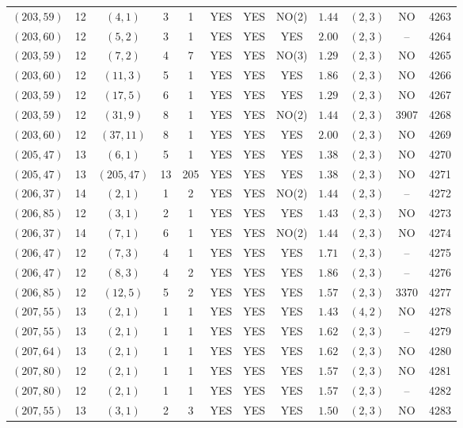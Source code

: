 \begin{longtable}{|c|c|c|c|c|c|c|c|c|c|c|c|}
$(203,59)$ & 12 & $(4,1)$ & 3 & 1 & YES & YES & NO(2) & $1.44$ & $(2,3)$ & NO & 4263\\
$(203,60)$ & 12 & $(5,2)$ & 3 & 1 & YES & YES & YES & $2.00$ & $(2,3)$ & -- & 4264\\
$(203,59)$ & 12 & $(7,2)$ & 4 & 7 & YES & YES & NO(3) & $1.29$ & $(2,3)$ & NO & 4265\\
$(203,60)$ & 12 & $(11,3)$ & 5 & 1 & YES & YES & YES & $1.86$ & $(2,3)$ & NO & 4266\\
$(203,59)$ & 12 & $(17,5)$ & 6 & 1 & YES & YES & YES & $1.29$ & $(2,3)$ & NO & 4267\\
$(203,59)$ & 12 & $(31,9)$ & 8 & 1 & YES & YES & NO(2) & $1.44$ & $(2,3)$ & 3907 & 4268\\
$(203,60)$ & 12 & $(37,11)$ & 8 & 1 & YES & YES & YES & $2.00$ & $(2,3)$ & NO & 4269\\
$(205,47)$ & 13 & $(6,1)$ & 5 & 1 & YES & YES & YES & $1.38$ & $(2,3)$ & NO & 4270\\
$(205,47)$ & 13 & $(205,47)$ & 13 & 205 & YES & YES & YES & $1.38$ & $(2,3)$ & NO & 4271\\
$(206,37)$ & 14 & $(2,1)$ & 1 & 2 & YES & YES & NO(2) & $1.44$ & $(2,3)$ & -- & 4272\\
$(206,85)$ & 12 & $(3,1)$ & 2 & 1 & YES & YES & YES & $1.43$ & $(2,3)$ & NO & 4273\\
$(206,37)$ & 14 & $(7,1)$ & 6 & 1 & YES & YES & NO(2) & $1.44$ & $(2,3)$ & NO & 4274\\
$(206,47)$ & 12 & $(7,3)$ & 4 & 1 & YES & YES & YES & $1.71$ & $(2,3)$ & -- & 4275\\
$(206,47)$ & 12 & $(8,3)$ & 4 & 2 & YES & YES & YES & $1.86$ & $(2,3)$ & -- & 4276\\
$(206,85)$ & 12 & $(12,5)$ & 5 & 2 & YES & YES & YES & $1.57$ & $(2,3)$ & 3370 & 4277\\
$(207,55)$ & 13 & $(2,1)$ & 1 & 1 & YES & YES & YES & $1.43$ & $(4,2)$ & NO & 4278\\
$(207,55)$ & 13 & $(2,1)$ & 1 & 1 & YES & YES & YES & $1.62$ & $(2,3)$ & -- & 4279\\
$(207,64)$ & 13 & $(2,1)$ & 1 & 1 & YES & YES & YES & $1.62$ & $(2,3)$ & NO & 4280\\
$(207,80)$ & 12 & $(2,1)$ & 1 & 1 & YES & YES & YES & $1.57$ & $(2,3)$ & NO & 4281\\
$(207,80)$ & 12 & $(2,1)$ & 1 & 1 & YES & YES & YES & $1.57$ & $(2,3)$ & -- & 4282\\
$(207,55)$ & 13 & $(3,1)$ & 2 & 3 & YES & YES & YES & $1.50$ & $(2,3)$ & NO & 4283\\

\end{longtable}
